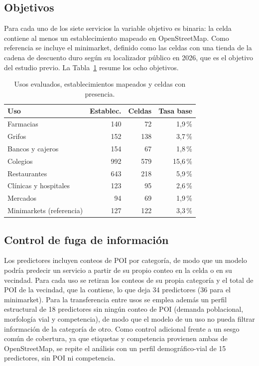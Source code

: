 \documentclass[10pt,letterpaper,twocolumn]{article}
\begin{document}
\subsection{Objetivos}

Para cada uno de los siete servicios la variable objetivo es binaria: la celda contiene al menos un establecimiento mapeado en OpenStreetMap. Como referencia se incluye el minimarket, definido como las celdas con una tienda de la cadena de descuento duro según su localizador público en 2026, que es el objetivo del estudio previo. La Tabla~\ref{tab:objetivos} resume los ocho objetivos.

\begin{table}[t]
\centering
\caption{Usos evaluados, establecimientos mapeados y celdas con presencia.}
\label{tab:objetivos}
\footnotesize
\setlength{\tabcolsep}{3pt}
\begin{tabular}{>{\raggedright\arraybackslash}p{2.5cm}rrr}
\toprule
Uso & Establec. & Celdas & Tasa base \\
\midrule
Farmacias & 140 & 72 & 1,9\,\% \\
Grifos & 152 & 138 & 3,7\,\% \\
Bancos y cajeros & 154 & 67 & 1,8\,\% \\
Colegios & 992 & 579 & 15,6\,\% \\
Restaurantes & 643 & 218 & 5,9\,\% \\
Clínicas y hospitales & 123 & 95 & 2,6\,\% \\
Mercados & 94 & 69 & 1,9\,\% \\
Minimarkets (referencia) & 127 & 122 & 3,3\,\% \\
\bottomrule
\end{tabular}
\end{table}

\subsection{Control de fuga de información}

Los predictores incluyen conteos de POI por categoría, de modo que un modelo podría predecir un servicio a partir de su propio conteo en la celda o en su vecindad. Para cada uso se retiran los conteos de su propia categoría y el total de POI de la vecindad, que la contiene, lo que deja 34 predictores (36 para el minimarket). Para la transferencia entre usos se emplea además un perfil estructural de 18 predictores sin ningún conteo de POI (demanda poblacional, morfología vial y competencia), de modo que el modelo de un uso no pueda filtrar información de la categoría de otro. Como control adicional frente a un sesgo común de cobertura, ya que etiquetas y competencia provienen ambas de OpenStreetMap, se repite el análisis con un perfil demográfico-vial de 15 predictores, sin POI ni competencia.
\end{document}
